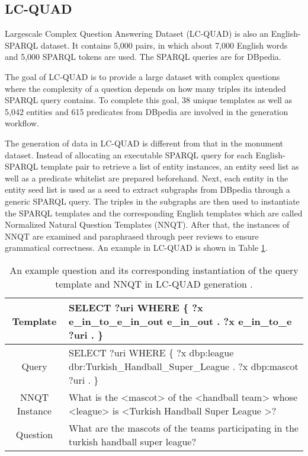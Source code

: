 \subsection{LC-QUAD} \label{subsection:lc-quad}

Largescale Complex Question Answering Dataset (LC-QUAD) \cite{trivedi2017lc} is also an English-SPARQL dataset. It contains 5,000 pairs, in which about 7,000 English words and 5,000 SPARQL tokens are used. The SPARQL queries are for DBpedia. 

The goal of LC-QUAD is to provide a large dataset with complex questions where the complexity of a question depends on how many triples its intended SPARQL query contains. To complete this goal, 38 unique templates as well as 5,042 entities and 615 predicates from DBpedia are involved in the generation workflow.

The generation of data in LC-QUAD is different from that in the monument dataset. Instead of allocating an executable SPARQL query for each English-SPARQL template pair to retrieve a list of entity instances, an entity seed list as well as a predicate whitelist are prepared beforehand. Next, each entity in the entity seed list is used as a seed to extract subgraphs from DBpedia through a generic SPARQL query. The triples in the subgraphs are then used to instantiate the SPARQL templates and the corresponding English templates which are called Normalized Natural Question Templates (NNQT). After that, the instances of NNQT are examined and paraphrased through peer reviews to ensure grammatical correctness. An example in LC-QUAD is shown in Table \ref{table:lcquad generation}.

\begin{table}[h]
\centering
\caption{An example question and its corresponding instantiation of the query template and NNQT in LC-QUAD generation \cite{trivedi2017lc}.}
\label{table:lcquad generation}
\begin{tabular}{c p{12cm}}
Template & SELECT ?uri WHERE \{ ?x e\_in\_to\_e\_in\_out e\_in\_out . ?x e\_in\_to\_e ?uri . \} \\
\hline
Query & SELECT ?uri WHERE \{ ?x dbp:league dbr:Turkish\_Handball\_Super\_League . ?x dbp:mascot ?uri . \} \\
\hline
NNQT Instance & What is the <mascot> of the <handball team> whose <league> is <Turkish Handball Super League >? \\
\hline
Question & What are the mascots of the teams participating in the turkish handball
super league? \\
\end{tabular}
\end{table}

